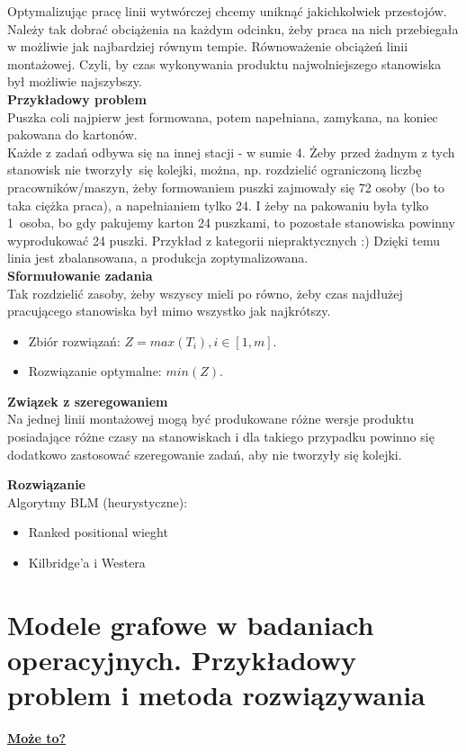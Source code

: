 \documentclass[10pt, a
4paper]{article}
\begin{document}
\noindent Optymalizując pracę linii wytwórczej chcemy uniknąć jakichkolwiek przestojów. Należy tak dobrać obciążenia na każdym odcinku, żeby praca na nich przebiegała w możliwie jak najbardziej równym tempie. Równoważenie obciążeń linii montażowej. Czyli, by czas wykonywania produktu najwolniejszego stanowiska był możliwie najszybszy. 
\\
\textbf{Przykładowy problem}\\
\indent Puszka coli najpierw jest formowana, potem napełniana, zamykana, na koniec pakowana do kartonów.\\
Każde z zadań odbywa się na innej stacji - w sumie 4.
Żeby przed żadnym z tych stanowisk nie tworzyły~się kolejki, można, np. rozdzielić ograniczoną liczbę pracowników/maszyn, żeby formowaniem puszki zajmowały się 72 osoby (bo to taka ciężka praca), a napełnianiem tylko 24. I żeby na pakowaniu była tylko 1~osoba, bo gdy pakujemy karton 24 puszkami, to pozostałe stanowiska powinny wyprodukować 24 puszki. Przykład z kategorii niepraktycznych :)
Dzięki temu linia jest zbalansowana, a produkcja zoptymalizowana.\\
\textbf{Sformułowanie zadania}\\
Tak rozdzielić zasoby, żeby wszyscy mieli po równo, żeby czas najdłużej pracującego stanowiska był mimo wszystko jak najkrótszy.
\begin{itemize}
\item Zbiór rozwiązań: $Z = max(T_i), i \in [1, m]$.
\item Rozwiązanie optymalne: $min(Z)$.
\end{itemize}
 
\noindent \textbf{Związek z szeregowaniem}\\
\indent Na jednej linii montażowej mogą być produkowane różne wersje produktu posiadające różne czasy na stanowiskach i dla takiego przypadku powinno się dodatkowo zastosować szeregowanie zadań, aby nie tworzyły się kolejki.

\noindent \textbf{Rozwiązanie}\\
Algorytmy BLM (heurystyczne):
\begin{itemize}
\item  Ranked positional wieght
\item  Kilbridge’a i Westera
\end{itemize}

\newpage
\section{Modele grafowe w badaniach operacyjnych. Przykładowy problem i metoda rozwiązywania}
\noindent\textbf{\href{https://fc.put.poznan.pl/sites/default/files/kkwarciak_rozprawa_streszczenie.pdf}{Może to?}} \\\\
\end{document}
